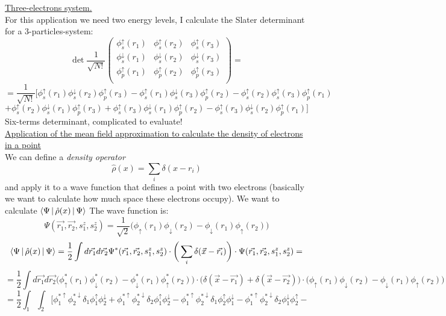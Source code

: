 \newline
\underline{Three-electrons system.}\\
\newline
For this application we need two energy levels, I calculate the Slater determinant for a 3-particles-system:\\
\[
\det\frac{1}{\sqrt{N!}}
\begin{pmatrix}
\phi_s^\uparrow(r_1)&\phi_s^\uparrow(r_2)&\phi_s^\uparrow(r_3)\\
\phi_s^\downarrow(r_1)&\phi_s^\downarrow(r_2)&\phi_s^\downarrow(r_3)\\
\phi_p^\uparrow(r_1)&\phi_p^\uparrow(r_2)&\phi_p^\uparrow(r_3)\\
\end{pmatrix}=
\]
\[
=\frac{1}{\sqrt{N!}}\big[
\phi_s^\uparrow(r_1)\phi_s^\downarrow(r_2)\phi_p^\uparrow(r_3)
-\phi_s^\uparrow(r_1)\phi_s^\downarrow(r_3)\phi_p^\uparrow(r_2)
-\phi_s^\uparrow(r_2)\phi_s^\uparrow(r_3)\phi_p^\uparrow(r_1)\]
\[+\phi_s^\uparrow(r_2)\phi_s^\downarrow(r_1)\phi_p^\uparrow(r_3)
+\phi_s^\uparrow(r_3)\phi_s^\downarrow(r_1)\phi_p^\uparrow(r_2)
-\phi_s^\uparrow(r_3)\phi_s^\downarrow(r_2)\phi_p^\uparrow(r_1)
\big]
\]
Six-terms determinant, complicated to evaluate!\\
\newline
\underline{Application of the mean field approximation to calculate the density of electrons in a point}\\
\newline
We can define a \textit{density operator}
\[
\hat{\rho}(x)=\sum_i\delta(x-r_i)
\]
and apply it to a wave function that defines a point with two electrons (basically we want to calculate how much space these electrons occupy). We want to calculate $\braket{\Psi\,|\,\hat{\rho}(x)\,|\,\Psi}$
The wave function is:
\[
\Psi(\vec{r_1},\vec{r_2},s_1^z,s_2^z)=\frac{1}{\sqrt{2}}\big(\phi_\uparrow(r_1)\phi_\downarrow(r_2)-\phi_\downarrow(r_1)\phi_\uparrow(r_2)\big)
\]
\[
\braket{\Psi\,|\,\hat{\rho}(x)\,|\,\Psi}=\frac{1}{2}\int d\vec{r_1}d\vec{r_2} \Psi^*(\vec{r_1},\vec{r_2},s_1^z,s_2^z)\cdot\bigg(\sum_i \delta(\vec{x}-\vec{r_i})\bigg)\cdot\Psi(\vec{r_1},\vec{r_2},s_1^z,s_2^z)=
\]
\[
=\frac{1}{2}\int d\vec{r_1}d\vec{r_2}\big(\phi^*_\uparrow(r_1)\phi^*_\downarrow(r_2)-\phi^*_\downarrow(r_1)\phi^*_\uparrow(r_2)\big)\cdot\big(\delta(\vec{x}-\vec{r_1})+\delta(\vec{x}-\vec{r_2})\big)\cdot\big(\phi_\uparrow(r_1)\phi_\downarrow(r_2)-\phi_\downarrow(r_1)\phi_\uparrow(r_2)\big)
\]
\[
=\frac{1}{2}\int_1\int_2\bigg[
\phi_1^{*\uparrow}\phi_2^{*\downarrow}\delta_1\phi_1^\uparrow\phi_2^\downarrow
+\phi_1^{*\uparrow}\phi_2^{*\downarrow}\delta_2\phi_1^\uparrow\phi_2^\downarrow
-\phi_1^{*\uparrow}\phi_2^{*\downarrow}\delta_1\phi_2^\uparrow\phi_1^\downarrow
-\phi_1^{*\uparrow}\phi_2^{*\downarrow}\delta_2\phi_1^\downarrow\phi_2^\uparrow -\]
